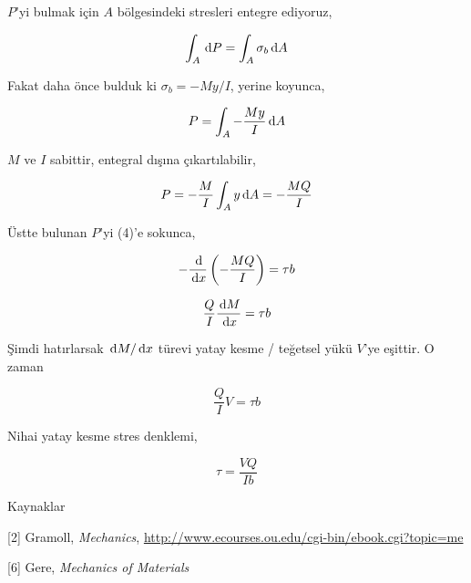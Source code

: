 \documentclass[12pt,fleqn]{article}\usepackage{../../common}
\begin{document}
$P$'yi bulmak için $A$ bölgesindeki stresleri entegre ediyoruz,

$$
\int_A \,\mathrm{d} P = \int_A \sigma_b \,\mathrm{d} A
$$

Fakat daha önce bulduk ki $\sigma_b = -My / I$, yerine koyunca,

$$
P = \int_A - \frac{My}{I} \,\mathrm{d} A
$$

$M$ ve $I$ sabittir, entegral dışına çıkartılabilir,

$$
P = - \frac{M}{I} \int_A y \,\mathrm{d} A = - \frac{MQ}{I}
$$

Üstte bulunan $P$'yi (4)'e sokunca,

$$
- \frac{\,\mathrm{d}}{\,\mathrm{d} x} \left( - \frac{MQ}{I} \right) = \tau b
$$

$$
\frac{Q}{I} \frac{\,\mathrm{d} M}{\,\mathrm{d} x} = \tau b
$$

Şimdi hatırlarsak $\,\mathrm{d} M/\,\mathrm{d} x$ türevi yatay kesme / teğetsel yükü $V$'ye
eşittir. O zaman

$$
\frac{Q}{I} V = \tau b
$$

Nihai yatay kesme stres denklemi,

$$
\tau = \frac{V Q}{I b}
$$

Kaynaklar

[2] Gramoll, {\em Mechanics},
    \url{http://www.ecourses.ou.edu/cgi-bin/ebook.cgi?topic=me}

[6] Gere, {\em Mechanics of Materials}
\end{document}

